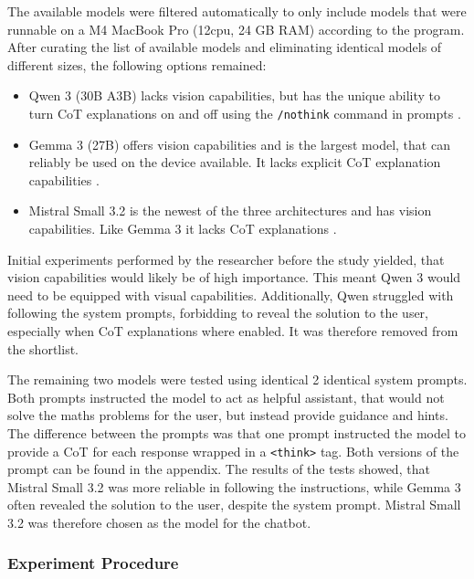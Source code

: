 The available models were filtered automatically to only include models that were runnable on a M4 MacBook Pro (12cpu, 24 GB RAM) according to the program. After curating the list of available models and eliminating identical models of different sizes, the following options remained:

\begin{itemize}
    \item Qwen 3 (30B A3B) lacks vision capabilities, but has the unique ability to turn \ac{CoT} explanations on and off using the \texttt{/nothink} command in prompts \parencite{Qwen2025}.

    \item Gemma 3 (27B) offers vision capabilities and is the largest model, that can reliably be used on the device available. It lacks explicit \ac{CoT} explanation capabilities \parencite{GemmaTeam2025}.

    \item Mistral Small 3.2 is the newest of the three architectures and has vision capabilities. Like Gemma 3 it lacks \ac{CoT} explanations \parencite{Mistral2025}.
\end{itemize}

Initial experiments performed by the researcher before the study yielded, that vision capabilities would likely be of high importance. This meant Qwen 3 would need to be equipped with visual capabilities. Additionally, Qwen struggled with following the system prompts, forbidding to reveal the solution to the user, especially when \ac{CoT} explanations where enabled. It was therefore removed from the shortlist.

The remaining two models were tested using identical 2 identical system prompts. Both prompts instructed the model to act as helpful assistant, that would not solve the maths problems for the user, but instead provide guidance and hints. The difference between the prompts was that one prompt instructed the model to provide a \ac{CoT} for each response wrapped in a \texttt{<think>} tag. Both versions of the prompt can be found in the appendix. The results of the tests showed, that Mistral Small 3.2 was more reliable in following the instructions, while Gemma 3 often revealed the solution to the user, despite the system prompt. Mistral Small 3.2 was therefore chosen as the model for the chatbot.

\subsubsection{Experiment Procedure} \label{sssec:experiment_procedure}

